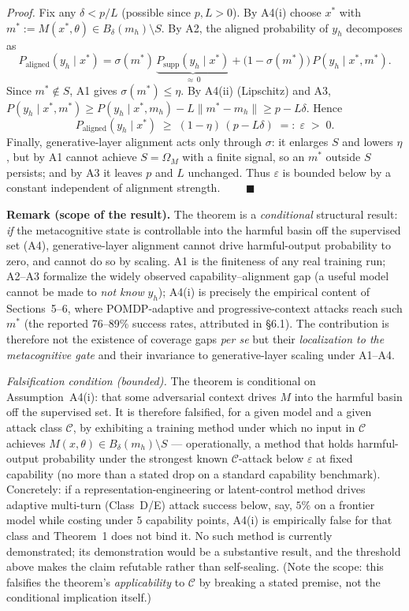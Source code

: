\documentclass[
  11pt,
]{article}
\begin{document}
\emph{Proof.} Fix any \(\delta < p/L\) (possible since \(p,L>0\)). By A4(i)
choose \(x^*\) with \(m^* := M(x^*,\theta) \in B_\delta(m_h)\setminus S\).
By A2, the aligned probability of \(y_h\) decomposes as
\[ P_{\text{aligned}}(y_h \mid x^*) = \sigma(m^*)\,\underbrace{P_{\text{supp}}(y_h\mid x^*)}_{\approx\,0} + \big(1-\sigma(m^*)\big)\,P(y_h\mid x^*,m^*). \]
Since \(m^* \notin S\), A1 gives \(\sigma(m^*)\le \eta\). By A4(ii)
(Lipschitz) and A3, \(P(y_h\mid x^*,m^*) \ge P(y_h\mid x^*,m_h) - L\lVert m^*-m_h\rVert \ge p - L\delta\). Hence
\[ P_{\text{aligned}}(y_h\mid x^*) \;\ge\; (1-\eta)\,(p - L\delta) \;=:\; \varepsilon \;>\;0. \]
Finally, generative-layer alignment acts only through \(\sigma\): it
enlarges \(S\) and lowers \(\eta\), but by A1 cannot achieve
\(S=\Omega_M\) with a finite signal, so an \(m^*\) outside \(S\) persists;
and by A3 it leaves \(p\) and \(L\) unchanged. Thus \(\varepsilon\) is
bounded below by a constant independent of alignment strength.
\(\qquad\blacksquare\)

\textbf{Remark (scope of the result).} The theorem is a \emph{conditional}
structural result: \emph{if} the metacognitive state is controllable into
the harmful basin off the supervised set (A4), generative-layer alignment
cannot drive harmful-output probability to zero, and cannot do so by
scaling. A1 is the finiteness of any real training run; A2--A3 formalize
the widely observed capability--alignment gap (a useful model cannot be
made to \emph{not know} \(y_h\)); A4(i) is precisely the empirical content
of Sections~5--6, where POMDP-adaptive and progressive-context attacks
reach such \(m^*\) (the reported 76--89\% success rates, attributed in
\S6.1). The contribution is therefore not the existence of coverage gaps
\emph{per se} but their \emph{localization to the metacognitive gate} and
their invariance to generative-layer scaling under A1--A4.

\emph{Falsification condition (bounded).} The theorem is conditional on
Assumption~A4(i): that some adversarial context drives \(M\) into the
harmful basin off the supervised set. It is therefore falsified, for a
given model and a given attack class \(\mathcal{C}\), by exhibiting a
training method under which no input in \(\mathcal{C}\) achieves
\(M(x,\theta)\in B_\delta(m_h)\setminus S\) --- operationally, a method
that holds harmful-output probability under the strongest known
\(\mathcal{C}\)-attack below \(\varepsilon\) at fixed capability (no more
than a stated drop on a standard capability benchmark). Concretely: if a
representation-engineering or latent-control method drives adaptive
multi-turn (Class~D/E) attack success below, say, \(5\%\) on a frontier
model while costing under \(5\) capability points, A4(i) is empirically
false for that class and Theorem~1 does not bind it. No such method is
currently demonstrated; its demonstration would be a substantive result,
and the threshold above makes the claim refutable rather than
self-sealing. (Note the scope: this falsifies the theorem's
\emph{applicability} to \(\mathcal{C}\) by breaking a stated premise, not
the conditional implication itself.)
\end{document}

